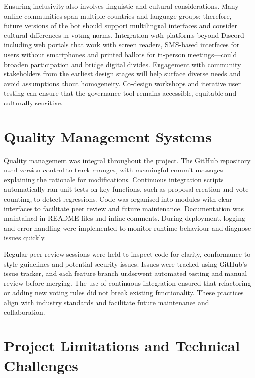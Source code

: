 Ensuring inclusivity also involves linguistic and cultural
considerations.  Many online communities span multiple countries and
language groups; therefore, future versions of the bot should support
multilingual interfaces and consider cultural differences in voting
norms.  Integration with platforms beyond Discord—including web portals
that work with screen readers, SMS‑based interfaces for users without
smartphones and printed ballots for in‑person meetings—could broaden
participation and bridge digital divides.  Engagement with community
stakeholders from the earliest design stages will help surface diverse
needs and avoid assumptions about homogeneity.  Co‑design workshops and
iterative user testing can ensure that the governance tool remains
accessible, equitable and culturally sensitive.

\section{Quality Management Systems}

Quality management was integral throughout the project.  The GitHub
repository used version control to track changes, with meaningful commit
messages explaining the rationale for modifications.  Continuous
integration scripts automatically ran unit tests on key functions, such as
proposal creation and vote counting, to detect regressions.  Code was
organised into modules with clear interfaces to facilitate peer review and
future maintenance.  Documentation was maintained in README files and
inline comments.  During deployment, logging and error handling were
implemented to monitor runtime behaviour and diagnose issues quickly.

Regular peer review sessions were held to inspect code for clarity,
conformance to style guidelines and potential security issues.  Issues
were tracked using GitHub’s issue tracker, and each feature branch
underwent automated testing and manual review before merging.  The use
of continuous integration ensured that refactoring or adding new voting
rules did not break existing functionality.  These practices align with
industry standards and facilitate future maintenance and collaboration.

\section{Project Limitations and Technical Challenges}

